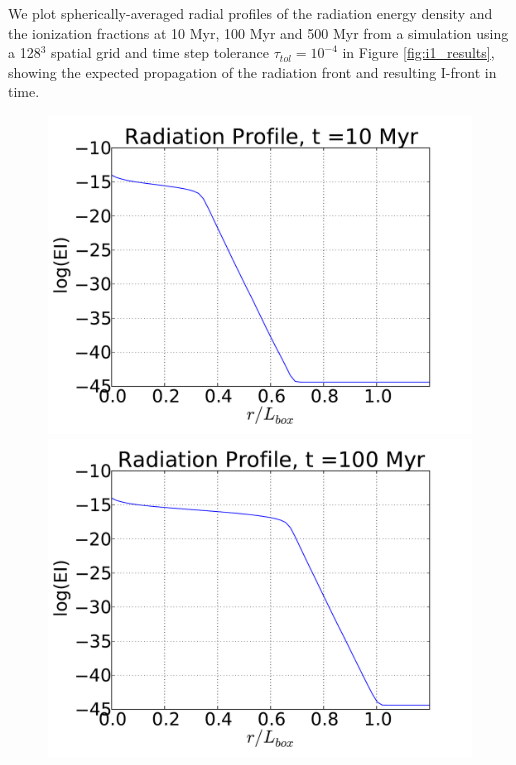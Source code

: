 We plot spherically-averaged radial profiles of the radiation energy
density and the ionization fractions at 10 Myr, 100 Myr and 500 Myr
from a simulation using a 128$^3$ spatial grid and time step
tolerance $\tau_{tol} = 10^{-4}$ in Figure \ref{fig:i1_results},
showing the expected propagation of the radiation front and resulting
I-front in time.
\begin{figure}[t]
\centerline{\hfill
  \includegraphics[scale=0.3, trim=1.0cm 1.0cm 1.0cm 0.5cm]{i1-Eprofiles_10Myr.pdf}
  \includegraphics[scale=0.3, trim=1.0cm 1.0cm 1.0cm 0.5cm]{i1-Eprofiles_100Myr.pdf}
}
\end{figure}
